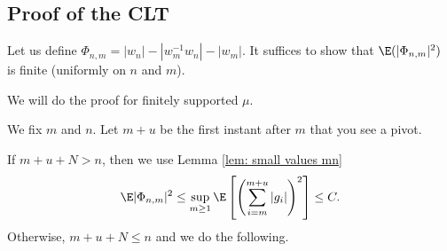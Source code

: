 \subsection{Proof of the CLT}

Let us define $\Phi_{n,m}=|w_n|-|w_m^{-1}w_n|-|w_m|$. It suffices to show that $\E(|\Phi_{n,m}|^2)$ is finite (uniformly on $n$ and $m$).

We will do the proof for finitely supported $\mu$.

We fix $m$ and $n$. Let $m+u$ be the first instant after $m$ that you see a pivot.

If $m+u+N>n$, then we use Lemma \ref{lem: small values mn} 
$$
\E |\Phi_{n,m}|^2\le \sup_{m\ge 1}\E\left[\left( \sum_{i=m}^{m+u}|g_i| \right)^2\right]\le C.
$$
Otherwise, $m+u+N\le n$ and we do the following.


